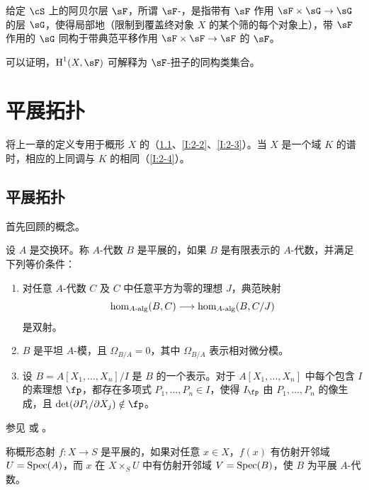 \subsubsection{}\label{I:1-6-6}
给定 $\cS$ 上的阿贝尔层 $\sF$，所谓 $\sF$-，是指带有 $\sF$ 作用 $\sF\times\sG\to\sG$ 的层 $\sG$，使得局部地（限制到覆盖终对象 $X$ 的某个筛的每个对象上），带 $\sF$ 作用的 $\sG$ 同构于带典范平移作用 $\sF\times\sF\to\sF$ 的 $\sF$。

可以证明，$\h^1(X,\sF)$ 可解释为 $\sF$-扭子的同构类集合。

\section{平展拓扑}\label{I:2}
将上一章的定义专用于概形 $X$ 的（\ref{I:2-1}、\ref{I:2-2}、\ref{I:2-3}）。当 $X$ 是一个域 $K$ 的谱时，相应的上同调与 $K$ 的相同（\ref{I:2-4}）。

\subsection{平展拓扑}\label{I:2-1}
首先回顾的概念。

\begin{definition}\label{I:2-1-1}
设 $A$ 是交换环。称 $A$-代数 $B$ 是平展的，如果 $B$ 是有限表示的 $A$-代数，并满足下列等价条件：
\begin{enumerate}[\indent a)]
\item 对任意 $A$-代数 $C$ 及 $C$ 中任意平方为零的理想 $J$，典范映射
\[
 \hom_{A\textnormal{-alg}}(B,C)\longrightarrow\hom_{A\textnormal{-alg}}(B,C/J)
\]
是双射。
\item $B$ 是平坦 $A$-模，且 $\Omega_{B/A}=0$，其中 $\Omega_{B/A}$ 表示相对微分模。
\item 设 $B=A[X_1,\dotsc,X_n]/I$ 是 $B$ 的一个表示。对于 $A[X_1,\dotsc,X_n]$ 中每个包含 $I$ 的素理想 $\fp$，都存在多项式 $P_1,\dotsc,P_n\in I$，使得 $I_\fp$ 由 $P_1,\dotsc,P_n$ 的像生成，且 $\det(\partial P_i/\partial X_j)\notin\fp$。
\end{enumerate}
\end{definition}
参见 \cite[I]{sga1} 或 \cite[V]{ra70}。

称概形态射 $f:X\to S$ 是平展的，如果对任意 $x\in X$，$f(x)$ 有仿射开邻域 $U=\operatorname{Spec}(A)$，而 $x$ 在 $X\times_SU$ 中有仿射开邻域 $V=\operatorname{Spec}(B)$，使 $B$ 为平展 $A$-代数。

